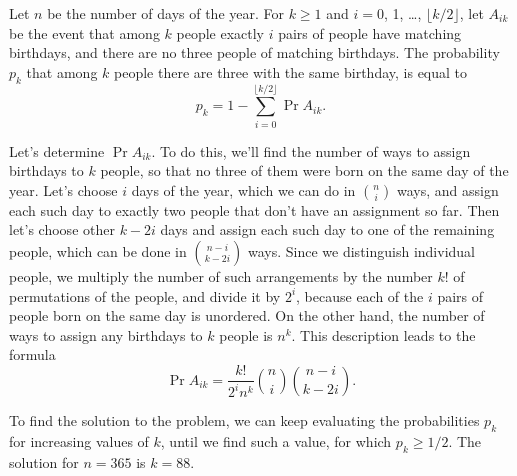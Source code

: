 \starred
Let $n$ be the number of days of the year.
For $k\ge1$ and $i=0$, 1, \dots, $\lfloor k/2\rfloor$, let $A_{ik}$ be the event that among $k$ people exactly $i$ pairs of people have matching birthdays, and there are no three people of matching birthdays.
The probability $p_k$ that among $k$ people there are three with the same birthday, is equal to
\[
    p_k = 1-\sum_{i=0}^{\lfloor k/2\rfloor}\Pr{A_{ik}}.
\]

Let's determine $\Pr{A_{ik}}$.
To do this, we'll find the number of ways to assign birthdays to $k$ people, so that no three of them were born on the same day of the year.
Let's choose $i$ days of the year, which we can do in $\binom{n}{i}$ ways, and assign each such day to exactly two people that don't have an assignment so far.
Then let's choose other $k-2i$ days and assign each such day to one of the remaining people, which can be done in $\binom{n-i}{k-2i}$ ways.
Since we distinguish individual people, we multiply the number of such arrangements by the number $k!$ of permutations of the people, and divide it by $2^i$, because each of the $i$ pairs of people born on the same day is unordered.
On the other hand, the number of ways to assign any birthdays to $k$ people is $n^k$.
This description leads to the formula
\[
    \Pr{A_{ik}} = \frac{k!}{2^in^k}\binom{n}{i}\binom{n-i}{k-2i}.
\]

To find the solution to the problem, we can keep evaluating the probabilities $p_k$ for increasing values of $k$, until we find such a value, for which $p_k\ge1/2$.
The solution for $n=365$ is $k=88$.
